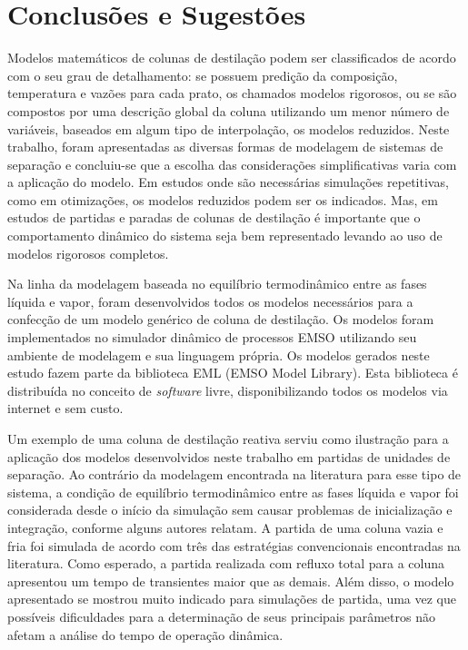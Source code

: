 %
% 
%
\chapter{Conclusões e Sugestões} \label{chap:conclusoes}
% 

Modelos matemáticos de colunas de destilação podem ser classificados de acordo com o seu
grau de detalhamento: se possuem predição da composição, temperatura e vazões para cada prato,
os chamados modelos rigorosos, ou se são compostos por uma descrição global da coluna
utilizando um menor número de variáveis, baseados em algum tipo de interpolação, os modelos
reduzidos. Neste trabalho, foram apresentadas as diversas formas de
modelagem de sistemas de separação e concluiu-se que a escolha das considerações
simplificativas varia com a aplicação do modelo. Em estudos onde são necessárias simulações
repetitivas, como em otimizações, os modelos reduzidos podem ser os indicados.
Mas, em estudos de partidas e paradas de colunas de destilação é importante que o
comportamento dinâmico do sistema seja bem representado levando ao uso de
modelos rigorosos completos. 

Na linha da modelagem baseada no equilíbrio termodinâmico entre as fases líquida e vapor, foram
desenvolvidos todos os modelos necessários para a confecção de um modelo genérico de coluna
de destilação. Os modelos foram implementados no simulador dinâmico de processos EMSO
utilizando seu ambiente de modelagem e sua linguagem própria. Os modelos gerados neste estudo
fazem parte da biblioteca EML (EMSO Model Library). Esta biblioteca é distribuída no conceito
de \emph{software} livre, disponibilizando todos os modelos via internet e sem
custo.

Um exemplo de uma coluna de destilação reativa serviu como ilustração para a aplicação
dos modelos desenvolvidos neste trabalho em partidas de unidades de separação.
Ao contrário da modelagem encontrada na literatura para esse tipo de sistema, a condição de
equilíbrio termodinâmico entre as fases líquida e vapor foi considerada desde o início da
simulação sem causar problemas de inicialização e integração, conforme alguns autores relatam.
A partida de uma
coluna vazia e fria foi simulada de acordo com três das estratégias convencionais encontradas
na literatura. Como esperado, a partida realizada com refluxo total para a coluna apresentou um
tempo de transientes maior que as demais. Além disso, o modelo apresentado se mostrou muito
indicado para simulações de partida, uma vez que possíveis dificuldades para a determinação de
seus principais parâmetros não afetam a análise do tempo de operação dinâmica.

